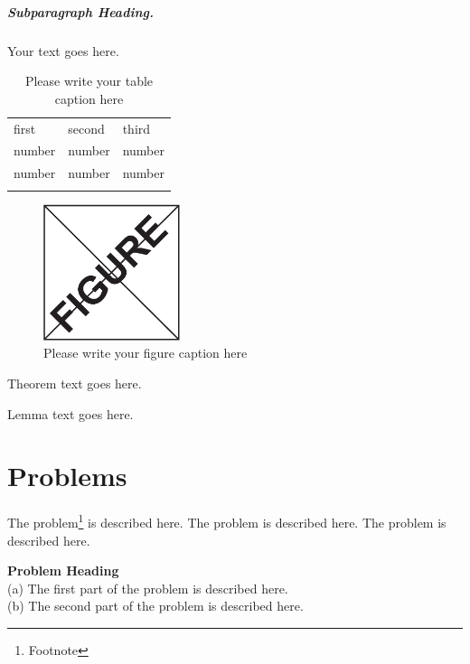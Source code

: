 \subparagraph{Subparagraph Heading.} Your text goes here.%
%
%
%
\begin{table}
\centering
\caption{Please write your table caption here}
\label{tab:1}       %
%
%
\begin{tabular}{lll}
\hline\noalign{\smallskip}
first & second & third  \\
\noalign{\smallskip}\hline\noalign{\smallskip}
number & number & number \\
number & number & number \\
\noalign{\smallskip}\hline
\end{tabular}
\end{table}
%
%
%
\begin{figure}
\centering
\includegraphics[height=4cm]{figure}
%
%
\caption{Please write your figure caption here}
\label{fig:1}       %
\end{figure}
%
%
\begin{theorem}
Theorem text goes here.
\end{theorem}
%
%
\begin{lemma}
Lemma text goes here.
\end{lemma}
%
%
\section*{Problems}
%
\begin{prob}
\label{prob1}
The problem\footnote{Footnote} is described here. The
problem is described here. The problem is described here.
\end{prob}

\begin{prob}
\label{prob2}
\textbf{Problem Heading}\\
(a) The first part of the problem is described here.\\
(b) The second part of the problem is described here.
\end{prob}



%
